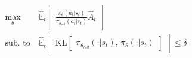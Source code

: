 %
\begin{align}
    \label{eqn:TRPO_optimal_max}
    \max_\theta\ & \hat{\mathbb{E}}_t\begin{bmatrix}\frac{\pi_{\theta}(a_t|s_t)}{\pi_{\theta_{\text{old}}}(a_t|s_t)}\hat{A}_t\end{bmatrix} \\
    \label{eqn:TRPO_optimal_sub}
    \text{sub. to}\ & \hat{\mathbb{E}}_t\begin{bmatrix}\text{KL}\begin{bmatrix}\pi_{\theta_{old}}(\cdot|s_t),\, \pi_{\theta}(\cdot|s_t)\end{bmatrix}\end{bmatrix} \leq \delta
\end{align}

